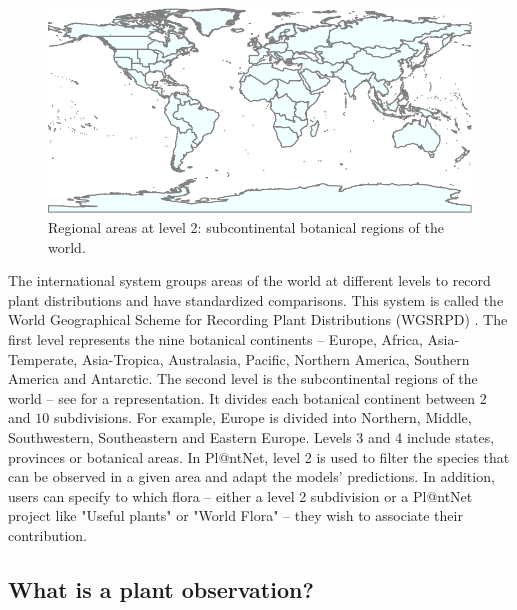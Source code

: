 \begin{figure}[tbh]
        \centering
        \includegraphics[width=.95\textwidth]{./images_plantnet/level2.pdf}
        \caption{Regional areas at level 2: subcontinental botanical regions of the world.  }
        \label{fig:level2}
\end{figure}

The international system groups areas of the world at different levels to record plant distributions and have standardized comparisons. This system is called the World Geographical Scheme for Recording Plant Distributions (WGSRPD) \citep{brummitt2001world}. The first level represents the nine botanical continents -- Europe, Africa, Asia-Temperate, Asia-Tropica, Australasia, Pacific, Northern America, Southern America and Antarctic.
The second level is the subcontinental regions of the world -- see  for a representation. It divides each botanical continent between $2$ and $10$ subdivisions. For example, Europe is divided into Northern, Middle, Southwestern, Southeastern and Eastern Europe.
Levels 3 and 4 include states, provinces or botanical areas.
In Pl@ntNet, level 2 is used to filter the species that can be observed in a given area and adapt the models' predictions.
In addition, users can specify to which flora -- either a level 2 subdivision or a Pl@ntNet project like "Useful plants" or "World Flora" -- they wish to associate their contribution.

\subsection{What is a plant observation?}
\label{sub:obs_plantnet_what}

